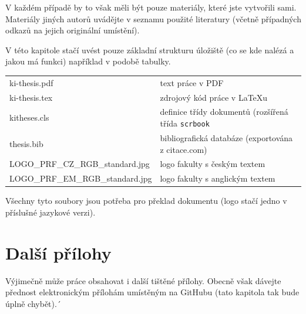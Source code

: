 \documentclass[male,czech]{kitheses}
\begin{document}
V každém případě by to však měli být pouze materiály, které jste vytvořili sami. Materiály jiných autorů uvádějte v seznamu použité literatury (včetně případných odkazů na jejich originální umístění).

V této kapitole stačí uvést pouze základní strukturu úložiště (co se kde nalézá a jakou má funkci) například v podobě tabulky. 

\begin{longtable}{ll}
\hline
ki-thesis.pdf & text práce v PDF \\
ki-thesis.tex & zdrojový kód práce v \LaTeX{}u \\
kitheses.cls & definice třídy dokumentů (rozšířená třída \texttt{scrbook} \\
thesis.bib & bibliografická databáze (exportována z citace.com) \\
LOGO\_PRF\_CZ\_RGB\_standard.jpg  & logo fakulty s českým textem \\
LOGO\_PRF\_EM\_RGB\_standard.jpg  & logo fakulty s anglickým textem  \\
\hline
\end{longtable}

Všechny tyto soubory jsou potřeba pro překlad dokumentu (logo stačí jedno v příslušné jazykové verzi).

\chapter{Další přílohy}

Výjimečně může práce obsahovat i další tištěné přílohy. Obecně však dávejte přednost elektronickým přílohám umístěným na GitHubu (tato kapitola tak bude úplně chybět).´
\end{document}
